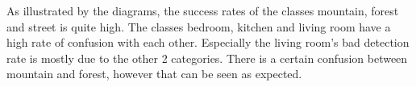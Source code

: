 As illustrated by the diagrams, the success rates of the classes mountain, forest and street is quite high. The classes bedroom, kitchen and living room have a high rate of confusion with each other. Especially the living room's bad detection rate is mostly due to the other 2 categories. There is a certain confusion between mountain and forest, however that can be seen as expected.